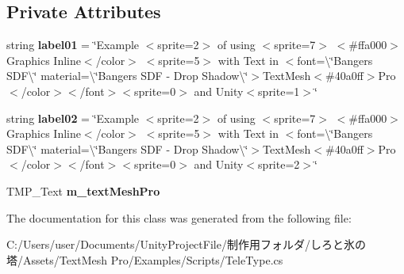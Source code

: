\subsection*{Private Attributes}
\begin{DoxyCompactItemize}
\item 
\mbox{\label{class_t_m_pro_1_1_examples_1_1_tele_type_a51dff8db56be78d4bc721ca16e185b8c}} 
string {\bfseries label01} = \char`\"{}Example $<$sprite=2$>$ of using $<$sprite=7$>$ $<$\#ffa000$>$Graphics Inline$<$/color$>$ $<$sprite=5$>$ with Text in $<$font=\textbackslash{}\char`\"{}Bangers S\+D\+F\textbackslash{}\char`\"{} material=\textbackslash{}\char`\"{}Bangers S\+DF -\/ Drop Shadow\textbackslash{}\char`\"{}$>$Text\+Mesh$<$\#40a0ff$>$\+Pro$<$/color$>$$<$/font$>$$<$sprite=0$>$ and Unity$<$sprite=1$>$\char`\"{}
\item 
\mbox{\label{class_t_m_pro_1_1_examples_1_1_tele_type_a33c3497dfd3bd9a94d59e8e6dc3a4d8d}} 
string {\bfseries label02} = \char`\"{}Example $<$sprite=2$>$ of using $<$sprite=7$>$ $<$\#ffa000$>$Graphics Inline$<$/color$>$ $<$sprite=5$>$ with Text in $<$font=\textbackslash{}\char`\"{}Bangers S\+D\+F\textbackslash{}\char`\"{} material=\textbackslash{}\char`\"{}Bangers S\+DF -\/ Drop Shadow\textbackslash{}\char`\"{}$>$Text\+Mesh$<$\#40a0ff$>$\+Pro$<$/color$>$$<$/font$>$$<$sprite=0$>$ and Unity$<$sprite=2$>$\char`\"{}
\item 
\mbox{\label{class_t_m_pro_1_1_examples_1_1_tele_type_aaa5fbd230494861742a944fe80f1226b}} 
T\+M\+P\+\_\+\+Text {\bfseries m\+\_\+text\+Mesh\+Pro}
\end{DoxyCompactItemize}


The documentation for this class was generated from the following file\+:\begin{DoxyCompactItemize}
\item 
C\+:/\+Users/user/\+Documents/\+Unity\+Project\+File/制作用フォルダ/しろと氷の塔/\+Assets/\+Text\+Mesh Pro/\+Examples/\+Scripts/Tele\+Type.\+cs\end{DoxyCompactItemize}
